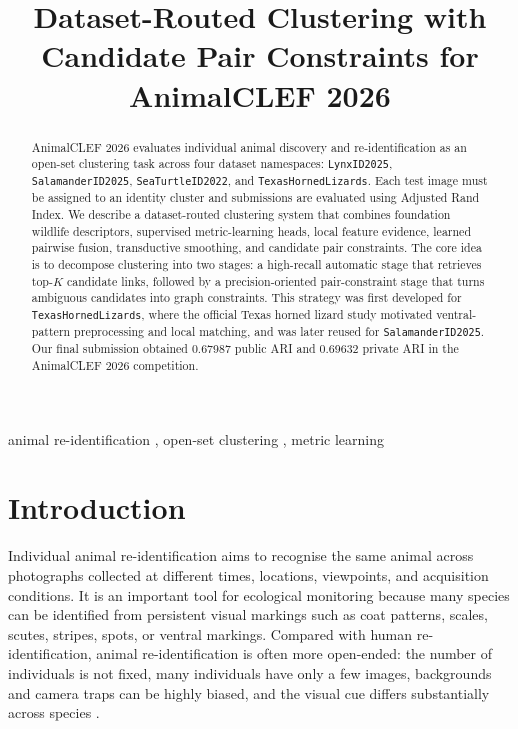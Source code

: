 \documentclass{ceurart}
\title{Dataset-Routed Clustering with Candidate Pair Constraints for AnimalCLEF 2026}
\newcommand{\dataset}[1]{\texttt{#1}}
\begin{document}
\begin{abstract}
AnimalCLEF 2026 evaluates individual animal discovery and re-identification as an open-set clustering task across four dataset namespaces: \dataset{LynxID2025}, \dataset{SalamanderID2025}, \dataset{SeaTurtleID2022}, and \dataset{TexasHornedLizards}. Each test image must be assigned to an identity cluster and submissions are evaluated using Adjusted Rand Index. We describe a dataset-routed clustering system that combines foundation wildlife descriptors, supervised metric-learning heads, local feature evidence, learned pairwise fusion, transductive smoothing, and candidate pair constraints. The core idea is to decompose clustering into two stages: a high-recall automatic stage that retrieves top-$K$ candidate links, followed by a precision-oriented pair-constraint stage that turns ambiguous candidates into graph constraints. This strategy was first developed for \dataset{TexasHornedLizards}, where the official Texas horned lizard study motivated ventral-pattern preprocessing and local matching, and was later reused for \dataset{SalamanderID2025}. Our final submission obtained 0.67987 public ARI and 0.69632 private ARI in the AnimalCLEF 2026 competition.
\end{abstract}

\begin{keywords}
animal re-identification \sep
open-set clustering \sep
metric learning
\end{keywords}

\maketitle

\section{Introduction}
Individual animal re-identification aims to recognise the same animal across photographs collected at different times, locations, viewpoints, and acquisition conditions. It is an important tool for ecological monitoring because many species can be identified from persistent visual markings such as coat patterns, scales, scutes, stripes, spots, or ventral markings. Compared with human re-identification, animal re-identification is often more open-ended: the number of individuals is not fixed, many individuals have only a few images, backgrounds and camera traps can be highly biased, and the visual cue differs substantially across species \cite{schneider2019animalreid,wildlifedatasets}.
\end{document}
